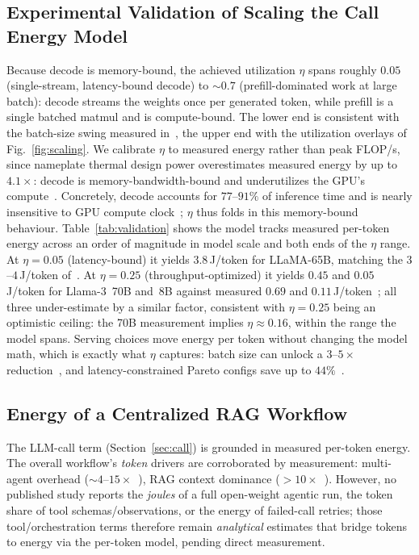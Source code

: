 \documentclass[journal]{IEEEtran}
\newif\ifshowchanges \showchangestrue
\newcommand{\NEW}{\ifshowchanges\color{blue}\fi}
\newcommand{\OLD}{\ifshowchanges\color{black}\fi}
\begin{document}
\subsection{Experimental Validation of Scaling the Call Energy Model} Because decode is memory-bound, the achieved utilization
$\eta$ spans roughly $0.05$ (single-stream, latency-bound \NEW{}decode\OLD{}) to \NEW{}$\sim\!0.7$
(prefill-dominated work at large batch): decode streams the weights once per generated token, while
prefill is a single batched matmul and is compute-bound\OLD{}. The lower end is
consistent with the batch-size swing measured in~\cite{mlenergy2025}\NEW{}, the upper end with the
utilization overlays of Fig.~\ref{fig:scaling}\OLD{}.
We calibrate $\eta$ to measured energy rather than peak FLOP/s, since nameplate thermal design power  overestimates
measured energy by up to $4.1\times$: decode is memory-bandwidth-bound and underutilizes the GPU's
compute~\cite{mlenergy2025,decode_membound2025}. Concretely, decode accounts for $77$--$91\%$ of
inference time and is nearly insensitive to GPU compute clock~\cite{decode_membound2025}; $\eta$ thus
folds in this memory-bound behaviour. Table~\ref{tab:validation} shows the model tracks measured per-token energy across an
order of magnitude in model scale and both ends of the $\eta$ range. At $\eta=0.05$
(latency-bound) it yields $3.8$\,J/token for LLaMA-65B, matching the $3$--$4$\,J/token
of~\cite{samsi2023words}. At $\eta=0.25$ (throughput-optimized) it yields $0.45$ and
$0.05$\,J/token for Llama-3~70B and~8B against measured $0.69$ and
$0.11$\,J/token~\cite{tokenpowerbench2026}; \NEW{}all three under-estimate by a similar factor\OLD{},
consistent with $\eta=0.25$ being an optimistic ceiling: the 70B measurement implies
$\eta\approx0.16$, within the range the model spans.  Serving choices move energy per
token without changing the model math, which is exactly what $\eta$ captures: batch
size can unlock a $3$--$5\times$ reduction~\cite{mlenergy_v3}, and latency-constrained
Pareto configs save up to $44\%$~\cite{mlenergy2025}.



\subsection{Energy of a Centralized RAG Workflow}
The LLM-call term (Section~\ref{sec:call}) is grounded in measured per-token
energy. The overall workflow's \emph{token} drivers are corroborated by measurement: multi-agent
overhead ($\sim\!4$--$15\times$~\cite{anthropic_multiagent}), RAG context dominance
($>\!10\times$~\cite{ragcache2024}). However, no published study reports the \emph{joules} of a full
open-weight agentic run, the token share of tool schemas/observations, or the energy of failed-call
retries; those tool/orchestration terms therefore remain \emph{analytical} estimates that bridge
tokens to energy via the per-token model, pending direct measurement.
\end{document}
